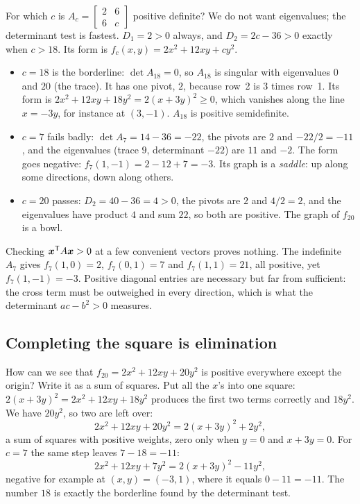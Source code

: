 \begin{example}\label{ex:u31-family}
For which $c$ is $A_c=\begin{bmatrix}2&6\\6&c\end{bmatrix}$ positive definite? We do not want
eigenvalues; the determinant test is fastest. $D_1=2>0$ always, and $D_2=2c-36>0$ exactly when
$c>18$. Its form is $f_c(x,y)=2x^2+12xy+cy^2$.
\begin{itemize}
  \item $c=18$ is the borderline: $\det A_{18}=0$, so $A_{18}$ is singular with eigenvalues
        $0$ and $20$ (the trace). It has one pivot, $2$, because row~2 is $3$ times row~1. Its form
        is $2x^2+12xy+18y^2=2(x+3y)^2\ge0$, which vanishes along the line $x=-3y$, for instance at
        $(3,-1)$. $A_{18}$ is positive semidefinite.
  \item $c=7$ fails badly: $\det A_7=14-36=-22$, the pivots are $2$ and $-22/2=-11$, and the
        eigenvalues (trace $9$, determinant $-22$) are $11$ and $-2$. The form goes negative:
        $f_7(1,-1)=2-12+7=-3$. Its graph is a \emph{saddle}: up along some directions, down along
        others.
  \item $c=20$ passes: $D_2=40-36=4>0$, the pivots are $2$ and $4/2=2$, and the eigenvalues
        have product $4$ and sum $22$, so both are positive. The graph of $f_{20}$ is a bowl.
\end{itemize}
\end{example}

\begin{trap}
Checking $\boldsymbol{x}^{\mathsf{T}} A\boldsymbol{x}>0$ at a few convenient vectors proves nothing. The indefinite $A_7$ gives
$f_7(1,0)=2$, $f_7(0,1)=7$ and $f_7(1,1)=21$, all positive, yet $f_7(1,-1)=-3$. Positive diagonal
entries are necessary but far from sufficient: the cross term must be outweighed in every
direction, which is what the determinant $ac-b^2>0$ measures.
\end{trap}

\subsection{Completing the square is elimination}

How can we see that $f_{20}=2x^2+12xy+20y^2$ is positive everywhere except the origin? Write it
as a sum of squares. Put all the $x$'s into one square: $2(x+3y)^2=2x^2+12xy+18y^2$ produces the
first two terms correctly and $18y^2$. We have $20y^2$, so two are left over:
\[
  2x^2+12xy+20y^2=2(x+3y)^2+2y^2 ,
\]
a sum of squares with positive weights, zero only when $y=0$ and $x+3y=0$. For $c=7$ the same
step leaves $7-18=-11$:
\[
  2x^2+12xy+7y^2=2(x+3y)^2-11y^2 ,
\]
negative for example at $(x,y)=(-3,1)$, where it equals $0-11=-11$. The number $18$ is exactly the
borderline found by the determinant test.

